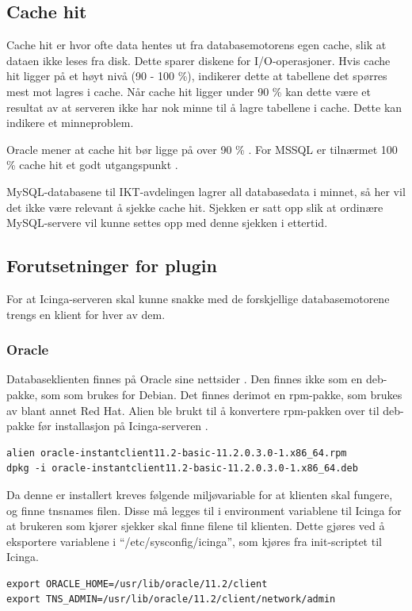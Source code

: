 \subsection*{Cache hit}
Cache hit er hvor ofte data hentes ut fra databasemotorens egen cache, slik at dataen ikke leses fra disk. Dette sparer diskene for I/O-operasjoner. Hvis cache hit ligger på et høyt nivå (90 - 100 \%), indikerer dette at tabellene det spørres mest mot lagres i cache. Når cache hit ligger under 90 \% kan dette være et resultat av at serveren ikke har nok minne til å lagre tabellene i cache. Dette kan indikere et minneproblem.

Oracle mener at cache hit bør ligge på over 90 \% \cite{oraclecachehit}. For MSSQL er tilnærmet 100 \% cache hit et godt utgangspunkt \cite{sqlmonitoring}.

MySQL-databasene til IKT-avdelingen lagrer all databasedata i minnet, så her vil det ikke være relevant å sjekke cache hit. Sjekken er satt opp slik at ordinære MySQL-servere vil kunne settes opp med denne sjekken i ettertid.

\subsection{Forutsetninger for plugin}
For at Icinga-serveren skal kunne snakke med de forskjellige databasemotorene trengs en klient for hver av dem. 

\subsubsection{Oracle}\label{sec:oracle}
Databaseklienten finnes på Oracle sine nettsider \cite{oracleclient}. Den finnes ikke som en deb-pakke, som som brukes for Debian. Det finnes derimot en rpm-pakke, som brukes av blant annet Red Hat. Alien ble brukt til å konvertere rpm-pakken over til deb-pakke før installasjon på Icinga-serveren \cite{debian:alien}. 

\begin{lstlisting}[style=example]
alien oracle-instantclient11.2-basic-11.2.0.3.0-1.x86_64.rpm 
dpkg -i oracle-instantclient11.2-basic-11.2.0.3.0-1.x86_64.deb
\end{lstlisting}

Da denne er installert kreves følgende miljøvariable for at klienten skal fungere, og finne tnsnames filen.
Disse må legges til i environment variablene til Icinga for at brukeren som kjører sjekker skal finne filene til klienten. Dette gjøres ved å eksportere variablene i ``/etc/sysconfig/icinga'', som kjøres fra init-scriptet til Icinga.
\begin{lstlisting}[style=example]
export ORACLE_HOME=/usr/lib/oracle/11.2/client
export TNS_ADMIN=/usr/lib/oracle/11.2/client/network/admin
\end{lstlisting}

